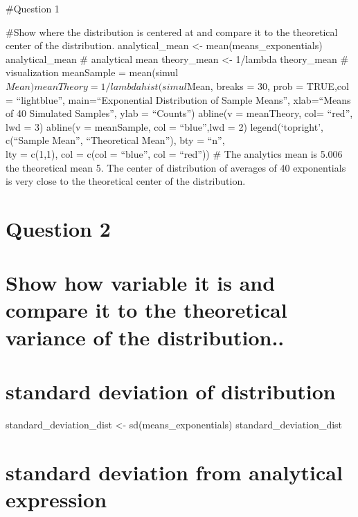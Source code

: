 \documentclass[
]{article}
\begin{document}
\#Question 1

\#Show where the distribution is centered at and compare it to the
theoretical center of the distribution. analytical\_mean \textless-
mean(means\_exponentials) analytical\_mean \# analytical mean
theory\_mean \textless- 1/lambda theory\_mean \# visualization
meanSample = mean(simul\(Mean) meanTheory = 1/lambda hist(simul\)Mean,
breaks = 30, prob = TRUE,col = ``lightblue'', main=``Exponential
Distribution of Sample Means'', xlab=``Means of 40 Simulated Samples'',
ylab = ``Counts'') abline(v = meanTheory, col= ``red'', lwd = 3)
abline(v = meanSample, col = ``blue'',lwd = 2) legend(`topright',
c(``Sample Mean'', ``Theoretical Mean''), bty = ``n'',\\
lty = c(1,1), col = c(col = ``blue'', col = ``red'')) \# The analytics
mean is 5.006 the theoretical mean 5. The center of distribution of
averages of 40 exponentials is very close to the theoretical center of
the distribution.

\hypertarget{question-2}{%
\section{Question 2}\label{question-2}}

\hypertarget{show-how-variable-it-is-and-compare-it-to-the-theoretical-variance-of-the-distribution..}{%
\section{Show how variable it is and compare it to the theoretical
variance of the
distribution..}\label{show-how-variable-it-is-and-compare-it-to-the-theoretical-variance-of-the-distribution..}}

\hypertarget{standard-deviation-of-distribution}{%
\section{standard deviation of
distribution}\label{standard-deviation-of-distribution}}

standard\_deviation\_dist \textless- sd(means\_exponentials)
standard\_deviation\_dist

\hypertarget{standard-deviation-from-analytical-expression}{%
\section{standard deviation from analytical
expression}\label{standard-deviation-from-analytical-expression}}
\end{document}
